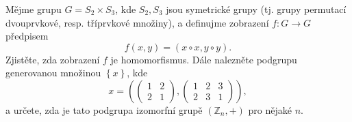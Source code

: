Mějme grupu $G=S_{2}\times S_{3}$, kde $S_{2},S_{3}$ jsou symetrické grupy (tj.
grupy permutací dvouprvkové, resp. tříprvkové množiny), a definujme zobrazení
$f:G\rightarrow G$ předpisem
$$f(x,y)=(x\circ x,y\circ y).$$
Zjistěte, zda zobrazení $f$ je homomorfismus. Dále nalezněte podgrupu
generovanou množinou $\left \{ x \right \}$, kde 
$$x=\left ( \begin{pmatrix}
1 &2 \\ 
2 &1 
\end{pmatrix},\begin{pmatrix}
1 &2  &3 \\ 
 2& 3 & 1
\end{pmatrix} \right ),$$
a určete, zda je tato podgrupa izomorfní grupě $\left ( \mathbb{Z}_{n},+ \right
)$ pro nějaké $n$.
